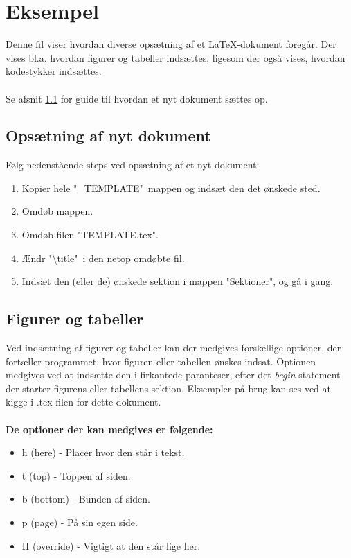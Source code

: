 \chapter{Eksempel}
Denne fil viser hvordan diverse opsætning af et LaTeX-dokument foregår. Der vises bl.a. hvordan figurer og tabeller indsættes, ligesom der også vises, hvordan kodestykker indsættes.\\
\smallskip\\
Se afsnit \ref{sec:setup_new_document} for guide til hvordan et nyt dokument sættes op.

\section{Opsætning af nyt dokument}
\label{sec:setup_new_document}
Følg nedenstående steps ved opsætning af et nyt dokument:
\begin{enumerate}
	\item Kopier hele "\_TEMPLATE"\ mappen og indsæt den det ønskede sted.
	\item Omdøb mappen.
	\item Omdøb filen "TEMPLATE.tex".
	\item Ændr "\textbackslash title"\ i den netop omdøbte fil.
	\item Indsæt den (eller de) ønskede sektion i mappen "Sektioner", og gå i gang.
\end{enumerate}

\section{Figurer og tabeller}
Ved indsætning af figurer og tabeller kan der medgives forskellige optioner, der fortæller programmet, hvor figuren eller tabellen ønskes indsat. Optionen medgives ved at indsætte den i firkantede paranteser, efter det \textit{begin}-statement der starter figurens eller tabellens sektion. Eksempler på brug kan ses ved at kigge i .tex-filen for dette dokument.\\
\medskip\\
\textbf{De optioner der kan medgives er følgende:}
\begin{itemize}
	\item h (here) - Placer hvor den står i tekst.
	\item t (top) - Toppen af siden.
	\item b (bottom) - Bunden af siden.
	\item p (page) - På sin egen side.
	\item H (override) - Vigtigt at den står lige her.
\end{itemize}

